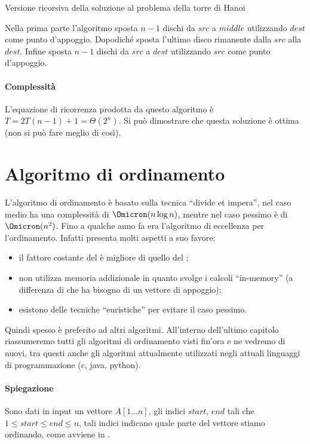 \begin{algorithm}[H]
	\caption{Versione ricorsiva della soluzione al problema della torre di Hanoi}
	
\end{algorithm}

Nella prima parte l'algoritmo sposta \(n-1\) dischi da \(src\) a \(middle\) utilizzando \(dest\) come punto d'appoggio.
Dopodiché sposta l'ultimo disco rimanente dalla \(src\) alla \(dest\).
Infine sposta \(n-1\) dischi da \(src\) a \(dest\) utilizzando \(src\) come punto d'appoggio.

\paragraph{Complessità}
L'equazione di ricorrenza prodotta da questo algoritmo è \(T = 2T(n-1) + 1 = \Theta(2^n)\).
Si può dimostrare che questa soluzione è ottima (non si può fare meglio di così).

\section{Algoritmo di ordinamento}

L'algoritmo di ordinamento \quickSort è basato sulla tecnica \enquote{divide et impera}, nel caso medio ha una complessità di \(\Omicron(n \log n)\), mentre nel caso pessimo è di \(\Omicron(n^2)\).
Fino a qualche anno fa era l'algoritmo di eccellenza per l'ordinamento.
Infatti presenta molti aspetti a suo favore:
\begin{itemize}
	\item il fattore costante del \quickSort è migliore di quello del \mergeSort;
	\item non utilizza memoria addizionale in quanto svolge i calcoli \enquote{in-memory} (a differenza di \mergeSort che ha bisogno di un vettore di appoggio);
	\item esistono delle tecniche \enquote{euristiche} per evitare il caso pessimo.
\end{itemize}
Quindi spesso è preferito ad altri algoritmi.
All'interno dell'ultimo capitolo riassumeremo tutti gli algoritmi di ordinamento visti fin'ora e ne vedremo di nuovi, tra questi anche gli algoritmi attualmente utilizzati negli attuali linguaggi di programmazione (c, java, python).

\paragraph{Spiegazione}
Sono dati in input un vettore \(A[1 \dots n]\), gli indici \(start\), \(end\) tali che \(1 \leqslant start \leqslant end \leqslant n\), tali indici indicano quale parte del vettore stiamo ordinando, come avviene in \mergeSort.

